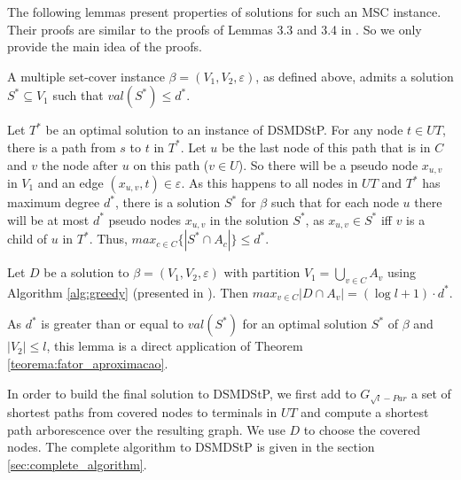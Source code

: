 

The following lemmas present properties of solutions for such an MSC instance. Their proofs are similar to the 
proofs of Lemmas 3.3 and 3.4 in \cite{Elkin2006}. So we only provide the main idea of the proofs.

\begin{Lem}
  \label{lem:val_solution}
  A  multiple set-cover instance $\beta=(V_1, V_2, \varepsilon)$, as defined above, admits a solution $S^* \subseteq V_1$ such that $val(S^*) \leq d^*$.
\end{Lem}
\begin{Proof}
Let $T^*$ be an optimal solution to an instance of DSMDStP. For any node $t \in UT$, there is a path from $s$ to $t$ in $T^*$. Let $u$ be the last node of this
path that is in $C$ and $v$ the node after $u$ on this path ($v \in U$). So there will be a pseudo node $x_{u, v}$ in $V_1$ and an edge $(x_{u, v}, t) \in \varepsilon$.
As this happens to all nodes in $UT$ and $T^*$ has maximum degree $d^*$, there is a solution $S^*$ for $\beta$ such that
for each node $u$ there will be at most $d^*$ pseudo nodes $x_{u,v}$ in the solution $S^*$, as $x_{u, v} \in S^*$ iff $v$ is a child of $u$ in $T^*$. Thus,  
$max_{c \in C}\{|S^* \cap A_c|\}\le d^*$.
\end{Proof}

\begin{Lem}
  \label{lem:max_pseudo_node_degree}
 Let $D$ be a solution to $\beta=(V_1, V_2, \varepsilon)$ with partition $V_1 = \bigcup_{v \in C}A_v$ using Algorithm \ref{alg:greedy} (presented in \cite{Chekuri2004}). 
Then $max_{v \in C}|D \cap A_v| = (\log{l}+1)\cdot d^*$.
\end{Lem}
\begin{Proof}
As $d^*$ is greater than or equal to $val(S^*)$ for an optimal solution $S^*$ of $\beta$ and $|V_2| \le l$, this lemma is a direct application of Theorem \ref{teorema:fator_aproximacao}.
\end{Proof}

In order to build the final solution to DSMDStP, we first add to $G_{\sqrt{l}-Par}$ a set of shortest 
paths from covered nodes to terminals in $UT$ and compute a shortest path arborescence over the resulting graph.
We use $D$ to choose the covered nodes. The complete algorithm to DSMDStP is given in the section \ref{sec:complete_algorithm}. 

